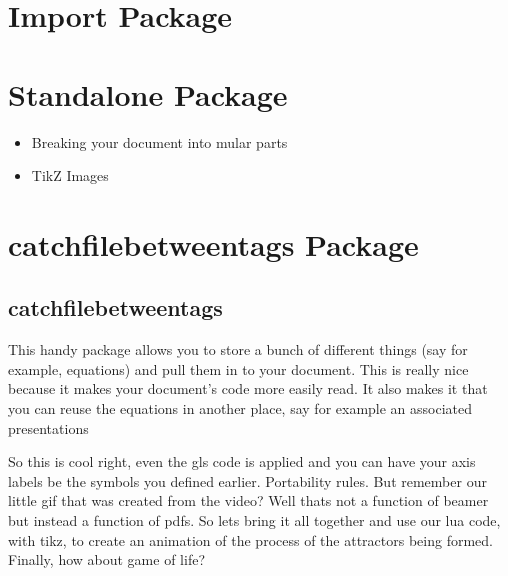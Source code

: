 \documentclass[hidelinks, float=false, crop=false]{standalone}
\begin{document}
    \section{Import Package}
    \section{Standalone Package}
        \begin{itemize}
            \item Breaking your document into mular parts
            \item TikZ Images
        \end{itemize}
    \section{catchfilebetweentags Package}
        \subsection{catchfilebetweentags}
            This handy package allows you to store a bunch of different things (say for example, equations) and pull them in to your document. This is really nice because it makes your document's code more easily read. It also makes it that you can reuse the equations in another place, say for example an associated presentations

        So this is cool right, even the gls code is applied and you can have your axis labels be the symbols you defined earlier. Portability rules.
        But remember our little gif that was created from the video? Well thats not a function of beamer but instead a function of pdfs. So lets bring it all together and use our lua code, with tikz, to create an animation of the process of the attractors being formed.
        Finally, how about game of life?

    \clearpage
    \standaloneBib
\end{document}
